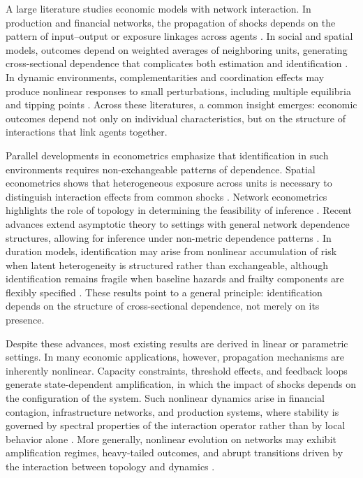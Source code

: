 \documentclass[12pt]{article}
\numberwithin{equation}{section}
\begin{document}
A large literature studies economic models with network interaction. In production and financial networks, the propagation of shocks depends on the pattern of input–output or exposure linkages across agents \citep{acemoglu2012network, acemoglu2015systemic}. In social and spatial models, outcomes depend on weighted averages of neighboring units, generating cross-sectional dependence that complicates both estimation and identification \citep{manski1993identification, anselin1988spatial, graham2017econometrics, depaula2017econometrics}. In dynamic environments, complementarities and coordination effects may produce nonlinear responses to small perturbations, including multiple equilibria and tipping points \citep{cooper1998coordination, morris1998coordination, diamond1982aggregate}. Across these literatures, a common insight emerges: economic outcomes depend not only on individual characteristics, but on the structure of interactions that link agents together.

Parallel developments in econometrics emphasize that identification in such environments requires non-exchangeable patterns of dependence. Spatial econometrics shows that heterogeneous exposure across units is necessary to distinguish interaction effects from common shocks \citep{anselin1988spatial, anselin2010thirty}. Network econometrics highlights the role of topology in determining the feasibility of inference \citep{graham2017econometrics, chandrasekhar2016econometrics, depaula2017econometrics, jackson2020networkecon}. Recent advances extend asymptotic theory to settings with general network dependence structures, allowing for inference under non-metric dependence patterns \citep{jiang2025networkclt}. In duration models, identification may arise from nonlinear accumulation of risk when latent heterogeneity is structured rather than exchangeable, although identification remains fragile when baseline hazards and frailty components are flexibly specified \citep{andersen1982cox, abbring2007heterogeneity, ghosh2024identifiability}. These results point to a general principle: identification depends on the structure of cross-sectional dependence, not merely on its presence.

Despite these advances, most existing results are derived in linear or parametric settings. In many economic applications, however, propagation mechanisms are inherently nonlinear. Capacity constraints, threshold effects, and feedback loops generate state-dependent amplification, in which the impact of shocks depends on the configuration of the system. Such nonlinear dynamics arise in financial contagion, infrastructure networks, and production systems, where stability is governed by spectral properties of the interaction operator rather than by local behavior alone \citep{acemoglu2015systemic, elliott2014financial}. More generally, nonlinear evolution on networks may exhibit amplification regimes, heavy-tailed outcomes, and abrupt transitions driven by the interaction between topology and dynamics \citep{vallarino2026stochastic}.
\end{document}
